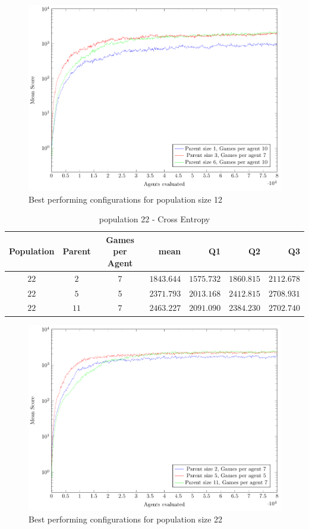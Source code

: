 \begin{figure}[H]
\centering
\includegraphics[scale=1]{data/ce_population_offspring/bestofeach_population/12x/PlotFile.pdf}
\caption{Best performing configurations for population size 12}
\end{figure}

\clearpage

\begin{table}[H]
\centering
\small
\begin{tabular}{c c c r r r r}
Population & Parent & Games per Agent & mean & Q1 & Q2 & Q3\\
\hline
$22$ & $2$ & 7 & $1843.644$ & $1575.732$ & $1860.815$ & $2112.678$\\
$22$ & $5$ & 5 & $2371.793$ & $2013.168$ & $2412.815$ & $2708.931$\\
$22$ & $11$ & 7 & $2463.227$ & $2091.090$ & $2384.230$ & $2702.740$\\
\end{tabular}
\caption{population 22 - Cross Entropy}
\end{table}

\begin{figure}[H]
\centering
\includegraphics[scale=1]{data/ce_population_offspring/bestofeach_population/22x/PlotFile.pdf}
\caption{Best performing configurations for population size 22}
\end{figure}

